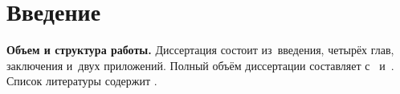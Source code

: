 \chapter*{Введение}							%

\newcommand{\actuality}{}
\newcommand{\aim}{\textbf{Целью}}
\newcommand{\tasks}{\textbf{задачи}}
\newcommand{\defpositions}{\textbf{Основные положения, выносимые на~защиту:}}
\newcommand{\novelty}{\textbf{Научная новизна:}}
\newcommand{\influence}{\textbf{Научная и практическая значимость}}
\newcommand{\reliability}{\textbf{Степень достоверности}}
\newcommand{\probation}{\textbf{Апробация работы.}}
\newcommand{\contribution}{\textbf{Личный вклад.}}
\newcommand{\publications}{\textbf{Публикации.}}


\begin{refcontext}
  \insertbiblioauthor                          %
\end{refcontext}

\textbf{Объем и структура работы.} Диссертация состоит из~введения, четырёх глав, заключения и~двух приложений.
%
Полный объём диссертации составляет  
с~
и~. Список литературы содержит  
.
